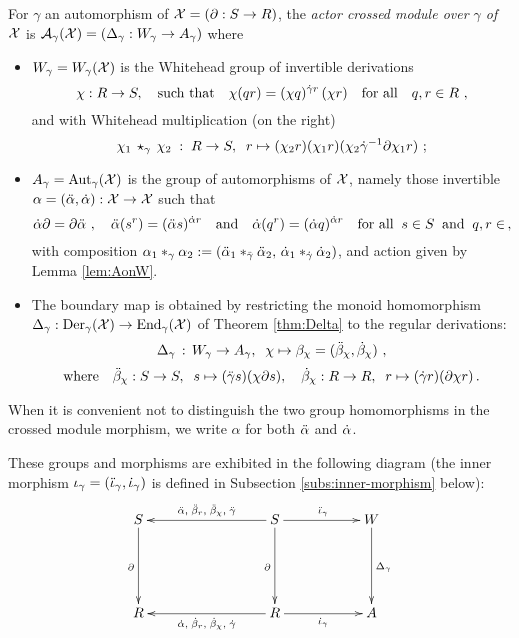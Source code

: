 \begin{defn} 
For $\gamma$ an automorphism of $\mathcal{X} = (\partial : S \to R)$, 
the \emph{actor crossed module over $\gamma$ of $\mathcal{X}$} is 
$\mathcal{A}_{\gamma}(\mathcal{X}) = (\Delta_{\gamma} : W_{\gamma} \to A_{\gamma})$  
where  
\begin{itemize}
\item
$W_{\gamma} = W_{\gamma}(\mathcal{X})$  
is the Whitehead group of invertible derivations
\begin{equation} \label{eq:der-rule}
\chi : R \to S, \quad \mbox{such that} \quad
\chi(qr) = (\chi q)^{\dot{\gamma} r}\,(\chi r)
\quad\mbox{for all}\quad
q,r \in R~,
\end{equation}
and with Whitehead multiplication (on the right)
\begin{equation} \label{eq:W-mult}
\chi_1 \,\star_{\gamma}\, \chi_2 \;:\; R \to S, \;\;
r \mapsto (\chi_2 r)(\chi_1 r)(\chi_2\dot{\gamma}^{-1}\partial\chi_1 r)~;
\end{equation}
\item
$A_{\gamma} = \mathrm{Aut}_{\gamma}(\mathcal{X})$  is the group of automorphisms of  $\mathcal{X}$,
namely those invertible  $\alpha = (\ddot{\alpha},\dot{\alpha}) : \mathcal{X} \to \mathcal{X}$  such that
$$
\dot{\alpha} \partial = \partial \ddot{\alpha}~, \quad
\ddot{\alpha}(s^r) = (\ddot{\alpha} s)^{\dot{\alpha} r}
\quad \mbox{and} \quad
\dot{\alpha}(q^r) = (\dot{\alpha} q)^{\dot{\alpha} r}
\quad \mbox{for all} \;\;
s \in S \;\; \mbox{and} \;\; q,r \in \,, 
$$ 
with composition \quad 
$\alpha_1 \ast_{\gamma} \alpha_2 
:= (\ddot{\alpha}_1 \ast_{\ddot{\gamma}} \ddot{\alpha}_2,\, \dot{\alpha}_1 \ast_{\dot{\gamma}} \dot{\alpha}_2)$, 
and action given by Lemma \ref{lem:AonW}. 
\item 
The boundary map is obtained by restricting the monoid homomorphism 
$\Delta_{\gamma} : \mathrm{Der}_{\gamma}(\mathcal{X}) \to \mathrm{End}_{\gamma}(\mathcal{X})$  
of Theorem \ref{thm:Delta} to the regular derivations: 
$$
\Delta_{\gamma} \,:\, W_{\gamma} \to A_{\gamma}, \;\; \chi \mapsto 
   \beta_{\chi} = (\ddot{\beta}_{\chi}, \dot{\beta}_{\chi})~,
$$
\begin{equation} \label{eq:actor-bdy}
\mbox{where} \quad
\ddot{\beta}_{\chi} : S \to S, \;\; s \mapsto (\ddot{\gamma} s)(\chi \partial s), \quad
  \dot{\beta}_{\chi} : R \to R, \;\; r \mapsto (\dot{\gamma} r)(\partial \chi r)\,.
\end{equation}
\end{itemize}
\end{defn}

When it is convenient not to distinguish the two group homomorphisms
in the crossed module morphism,
we write  $\alpha$  for both  $\ddot{\alpha}$  and  $\dot{\alpha}$.

These groups and morphisms are exhibited in the following diagram 
(the inner morphism $\iota_{\gamma} = (\ddot{\iota}_{\gamma},\dot{\iota}_{\gamma})$ 
is defined in Subsection \ref{subs:inner-morphism} below):
\begin{equation} \label{eq:sqX}
\vcenter{\xymatrix{
  S \ar[dd]_{\partial}
    &&&  S \ar[lll]_{\dda,\;\ddb_r,\;\ddb_{\chi},\;\ddg} 
            \ar[dd]_{\partial} \ar[rr]^{\ddi_{\gamma}}
         &&  W  \ar[dd]^{\Delta_{\gamma}}   \\
    &&& &&   \\
  R
    &&&  R \ar[lll]^{\da,\;\db_r,\;\db_{\chi},\;\dg} 
            \ar[rr]_{\di_{\gamma}}
         &&  A \\
}} 
\end{equation}

